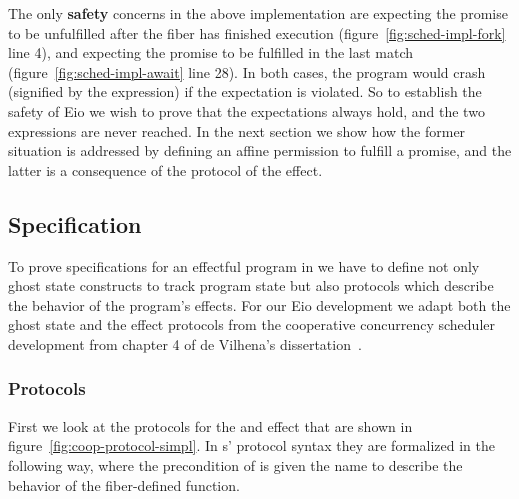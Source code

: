 The only \textbf{safety} concerns in the above implementation are  expecting the promise to be unfulfilled after the fiber has finished execution (figure~\ref{fig:sched-impl-fork} line 4),
and  expecting the promise to be fulfilled in the last match (figure~\ref{fig:sched-impl-await} line 28).
In both cases, the program would crash (signified by the  expression) if the expectation is violated.
So to establish the safety of Eio we wish to prove that the expectations always hold, and the two  expressions are never reached.
In the next section we show how the former situation is addressed by defining an affine permission to fulfill a promise, and the latter is a consequence of the protocol of the \esuspend{} effect.

\subsection{Specification}
\label{sec:sched-spec}

To prove specifications for an effectful program in \hazel{} we have to define not only ghost state constructs to track program state but also protocols which describe the behavior of the program's effects.
For our Eio development we adapt both the ghost state and the effect protocols from the cooperative concurrency scheduler development from chapter 4 of de Vilhena's dissertation~\cite{de2022proof}.

\subsubsection{Protocols}
\label{sec:sched-spec-protocols}

First we look at the protocols for the \efork{} and \esuspend{} effect that are shown in figure~\ref{fig:coop-protocol-simpl}.
In \hazel{}s' protocol syntax they are formalized in the following way, where the precondition of \esuspend{} is given the name \gsIsReg{} to describe the behavior of the fiber-defined  function.

